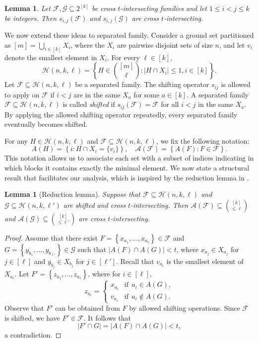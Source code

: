 \documentclass[11pt]{article}
\newtheorem{lemma}[theorem]{Lemma}
\begin{document}
\begin{lemma}\cite{G23} \label{G23}
 Let $\mathcal{F},\mathcal{G}  \subseteq 2^{[k]}$  be  cross $t$-intersecting families and let $1 \leq i<j \leq k$ be integers.
Then $s_{i, j}(\mathcal{F})$ and $s_{i, j}(\mathcal{G})$ are cross $t$-intersecting.
\end{lemma}




We now extend these ideas to separated family. Consider a ground set partitioned as $[m] = \bigcup_{i \in [k]} X_i$, where the $X_i$ are pairwise disjoint sets of size $n$, and let $v_i$ denote the smallest element in $X_i$. For every $\ell\in [k]$, $$\mathcal{H}(n,k,\ell)=\left\{H\in\binom {[m]}{\ell}:|H\cap X_i|\le 1,i\in [k]\right\}.$$ 
Let $\mathcal{F}\subseteq\mathcal{H}(n,k,\ell)$ be a separated family. The shifting operator $s_{ij}$ is allowed to apply on  $\mathcal{F}$ if $i<j$ are in the same $X_a$ for some $a\in [k]$.
A separated family $\mathcal{F}\subseteq\mathcal{H}(n,k,\ell)$  is called \textit{shifted} if $s_{ij}(\mathcal{F})=\mathcal{F}$ for all $i<j$ in the same $X_a$.
By applying the allowed shifting operator repeatedly, every 
separated family eventually becomes shifted. 



For any $H\in \mathcal{H}(n,k,\ell)$ and $\mathcal{F}\subseteq \mathcal{H}(n,k,\ell)$,  we fix the following notation:
$$
A(H)=\left\{i:H\cap X_i=\{v_i\}\right\},\quad \mathcal{A}(\mathcal{F})=\left\{A(F):F\in\mathcal{F}\right\}.
$$
This notation allows us to associate each set with a subset of indices indicating in which blocks it contains exactly the minimal element. We now state a structural result that facilitates our analysis, which is inspired by the reduction lemma in \cite{F23, FLWY2024, L23}. 


\begin{lemma}[Reduction lemma]\label{4}
Suppose that $\mathcal{F}\subseteq\mathcal{H}(n,k,\ell)$  and  $\mathcal{G}\subseteq\mathcal{H}(n,k,\ell')$  are shifted and  cross $t$-intersecting. Then $\mathcal{A}(\mathcal{F})\subseteq\binom{[k]}{\le \ell}$ and $\mathcal{A}(\mathcal{G})\subseteq \binom{[k]}{\le \ell'}$ are cross $t$-intersecting.
\end{lemma}
\begin{proof}
    Assume that there exist $F=\left\{x_{a_{1}},\ldots,x_{a_{\ell}} \right\}\in\mathcal{F}$ and $G= \left\{y_{b_{1}},\ldots,y_{b_{\ell'}}\right\}\in\mathcal{G}$ such that $\left|A(F)\cap A(G)\right|<t$, where $x_{a_{j}}\in X_{a_{j}}$  for $j\in[\ell]$ and $y_{b_{j}}\in X_{b_{j}}$  for $j\in[\ell']$. 
     Recall that $v_{a_{i}}$ is the smallest element of $X_{a_{i}}$.
    Let $F'=\left\{z_{a_{1}},\ldots,z_{a_{\ell}}\right\}$, where for $i\in[\ell]$, 
$$
z_{a_{i}}=
\begin{cases}
    x_{a_{i}} &\text{if} \ \ a_{i}\in A(G),\\
    v_{a_{i}} &\text{if} \ \ a_{i}\notin A(G).
\end{cases}
$$
Observe that $F'$ can be obtained from $F$ by allowed shifting operations. Since $\mathcal{F}$ is shifted, we have $F'\in\mathcal{F}$. It follows that
$$
\left|F'\cap G \right|= \left|A(F)\cap A(G) \right|<t,
$$
a contradiction.
\end{proof}
\end{document}
